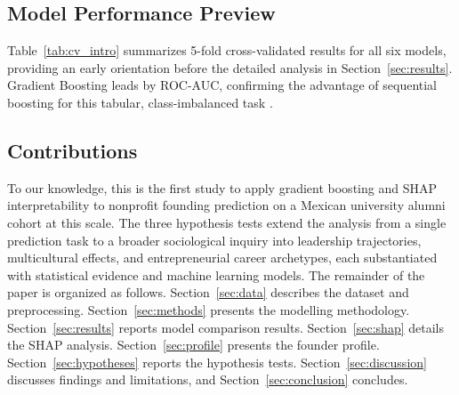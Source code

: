 \documentclass[10pt,twocolumn]{article}
\begin{document}
\subsection{Model Performance Preview}

Table~\ref{tab:cv_intro} summarizes 5-fold cross-validated results for all six
models, providing an early orientation before the detailed analysis in
Section~\ref{sec:results}. Gradient Boosting leads by ROC-AUC, confirming the
advantage of sequential boosting for this tabular, class-imbalanced task
\cite{naveenkumar2026, karimabdallah2025}.

\begin{table}[H]
\centering
\caption{5-fold CV results preview. Models ranked by ROC-AUC.}
\label{tab:cv_intro}
\end{table}

\subsection{Contributions}

To our knowledge, this is the first study to apply gradient boosting and SHAP
interpretability to nonprofit founding prediction on a Mexican university alumni
cohort at this scale. The three hypothesis tests extend the analysis from a
single prediction task to a broader sociological inquiry into leadership
trajectories, multicultural effects, and entrepreneurial career archetypes, each
substantiated with statistical evidence and machine learning models. The
remainder of the paper is organized as follows. Section~\ref{sec:data} describes
the dataset and preprocessing. Section~\ref{sec:methods} presents the modelling
methodology. Section~\ref{sec:results} reports model comparison results.
Section~\ref{sec:shap} details the SHAP analysis. Section~\ref{sec:profile}
presents the founder profile. Section~\ref{sec:hypotheses} reports the
hypothesis tests. Section~\ref{sec:discussion} discusses findings and
limitations, and Section~\ref{sec:conclusion} concludes.
\end{document}
